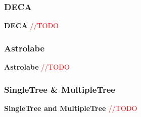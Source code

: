 \subsubsection{DECA}

\textbf{DECA} \cite{Artigas2006} \textcolor{red}{//TODO}

\subsubsection{Astrolabe}

\textbf{Astrolabe} \cite{Renesse2003} \textcolor{red}{//TODO}

\subsubsection{SingleTree \& MultipleTree}

\textbf{SingleTree \cite{} and MultipleTree \cite{}} \textcolor{red}{//TODO}

